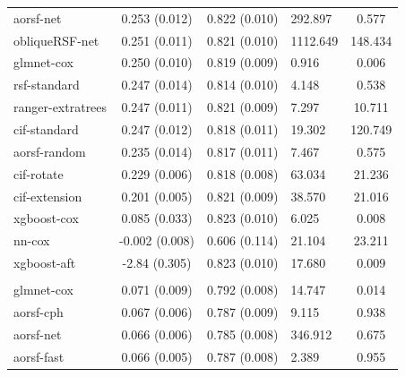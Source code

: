 \documentclass[twoside,11pt]{article}\usepackage[]{graphicx}\usepackage[]{xcolor}
\newenvironment{knitrout}{}{} %
\begin{document}
\begin{knitrout}
\begin{longtable}[t]{lcclc}
\hspace{1em}aorsf-net & 0.253 (0.012) & 0.822 (0.010) & 292.897 & 0.577\\
\hspace{1em}obliqueRSF-net & 0.251 (0.011) & 0.821 (0.010) & 1112.649 & 148.434\\
\hspace{1em}glmnet-cox & 0.250 (0.010) & 0.819 (0.009) & 0.916 & 0.006\\
\hspace{1em}rsf-standard & 0.247 (0.014) & 0.814 (0.010) & 4.148 & 0.538\\
\hspace{1em}ranger-extratrees & 0.247 (0.011) & 0.821 (0.009) & 7.297 & 10.711\\
\hspace{1em}cif-standard & 0.247 (0.012) & 0.818 (0.011) & 19.302 & 120.749\\
\hspace{1em}aorsf-random & 0.235 (0.014) & 0.817 (0.011) & 7.467 & 0.575\\
\hspace{1em}cif-rotate & 0.229 (0.006) & 0.818 (0.008) & 63.034 & 21.236\\
\hspace{1em}cif-extension & 0.201 (0.005) & 0.821 (0.009) & 38.570 & 21.016\\
\hspace{1em}xgboost-cox & 0.085 (0.033) & 0.823 (0.010) & 6.025 & 0.008\\
\hspace{1em}nn-cox & -0.002 (0.008) & 0.606 (0.114) & 21.104 & 23.211\\
\hspace{1em}xgboost-aft & -2.84 (0.305) & 0.823 (0.010) & 17.680 & 0.009\\
\addlinespace[0.3em]
\hline
\multicolumn{5}{l}{\textit{\textbf{SPRINT; CVD death, n = 9361, p = 174}}}\\
\hline
\hspace{1em}glmnet-cox & 0.071 (0.009) & 0.792 (0.008) & 14.747 & 0.014\\
\hspace{1em}aorsf-cph & 0.067 (0.006) & 0.787 (0.009) & 9.115 & 0.938\\
\hspace{1em}aorsf-net & 0.066 (0.006) & 0.785 (0.008) & 346.912 & 0.675\\
\hspace{1em}aorsf-fast & 0.066 (0.005) & 0.787 (0.008) & 2.389 & 0.955\\

\end{longtable}
\end{knitrout}
\end{document}
